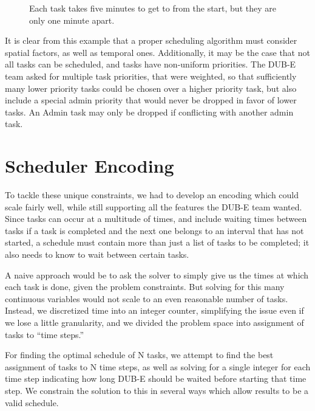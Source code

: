 \documentclass[11pt]{article}
\begin{document}
\begin{figure}
  \caption{
    Each task takes five minutes
    to get to from the start,
    but they are only one minute apart.
  }
  \label{fig:overview-example}
\end{figure}

It is clear from this example that
a proper scheduling algorithm must consider spatial factors,
as well as temporal ones.
Additionally, it may be the case that not all tasks can be scheduled,
and tasks have non-uniform priorities.
The DUB-E team asked for multiple task priorities,
that were weighted,
so that sufficiently many lower priority tasks
could be chosen over a higher priority task,
but also include a special admin priority
that would never be dropped in favor of lower tasks. An
Admin task may only be dropped if conflicting with another admin
task.


\section{Scheduler Encoding}
To tackle these unique constraints,
we had to develop an encoding which could scale fairly well,
while still supporting all the features the DUB-E team wanted.
Since tasks can occur at a multitude of times,
and include waiting times between tasks
if a task is completed and the next one
belongs to an interval that has not started,
a schedule must contain more than just a list of tasks to be completed;
it also needs to know to wait between certain tasks.

A naive approach would be to ask the solver
to simply give us the times at which each task is done,
given the problem constraints.
But solving for this many continuous variables
would not scale to an even reasonable number of tasks.
Instead, we discretized time into an integer counter,
simplifying the issue even if we lose a little granularity,
and we divided the problem space into assignment of tasks
to ``time steps.''

For finding the optimal schedule of N tasks,
we attempt to find the best assignment
of tasks to N time steps,
as well as solving for a single integer for each time step
indicating how long DUB-E should be waited before starting that time step.
We constrain the solution to this in several ways
which allow results to be a valid schedule.
\end{document}
